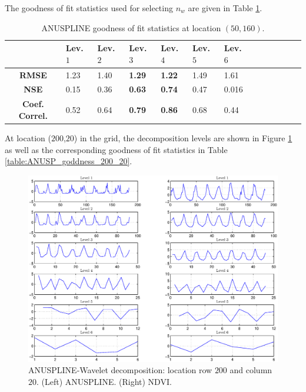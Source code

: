 \documentclass[10pt,letterpaper,conference]{ieeeconf}
\begin{document}
The goodness of fit statistics used for selecting $n_w$ are given in Table 
\ref{table:ANUSP_goddness_50_160}.
\begin{table}[ht] 
\caption{ANUSPLINE goodness of fit statistics at location $(50,160)$.}
\vspace*{-0.15in}
\label{table:ANUSP_goddness_50_160}
\vskip4mm
\centering
\begin{tabularx}{\columnwidth}{@{}>{\bfseries}c*{12}{X}@{}}
\hline \hline
 & Lev. $1$ & Lev. $2$ & Lev. $3$ & Lev. $4$ & Lev. $5$ & Lev. 
$6$ \\
\hline \hline
RMSE & 1.23&1.40& {\bf 1.29}& {\bf 1.22}&1.49&1.61 \\
\hline
NSE & 0.15&0.36&{\bf 0.63}& {\bf 0.74}&0.47&0.016 \\
\hline
Coef. Correl. & 0.52&0.64&{\bf 0.79}& {\bf 0.86}&0.68&0.44 \\
\hline
\end{tabularx}
\end{table}
At location ($200$,$20$) in the grid, the decomposition levels are 
shown in Figure \ref{fig:level_decomposition2} as well as the corresponding 
goodness of fit statistics in Table \ref{table:ANUSP_goddness_200_20}.
\begin{figure}[ht]
\begin{center}
\includegraphics[width=\columnwidth]{point200_20}
\vspace*{-0.2in}
\caption{ANUSPLINE-Wavelet decomposition: location row $200$ and column $20$. 
(Left) ANUSPLINE. (Right) NDVI.}
\label{fig:level_decomposition2}
\end{center}
\end{figure}
\end{document}
